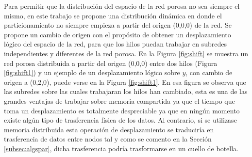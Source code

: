 Para permitir que la distribución del espacio de la red porosa no sea siempre el mismo, en este trabajo se propone
una distribución dinámica en donde el particionamiento no siempre empieza a partir del origen (0,0,0) de la red.
Se propone un cambio de origen con el propósito de obtener un desplazamiento lógico del espacio de la red, para que los hilos 
puedan trabajar en subredes independientes y diferentes de la red porosa.
En la Figura \ref{fig:shift} se muestra un red porosa distribuida a partir del origen (0,0,0) entre dos hilos (Figura \ref{fig:shift1}) 
y un ejemplo de un desplazamiento lógico sobre $y$, con cambio de origen a (0,2,0), puede verse en la Figura \ref{fig:shift1}. En esa figura
se observa que las subredes sobre las cuales 
trabajaran los hilos han cambiado, esta es una de las grandes ventajas de trabajar sobre memoria compartida ya que el tiempo 
que  toma un desplazamiento es totalmente despreciable ya que en ningún momento existe algún tipo de trasferencia física de los datos. 
Al contrario, si se utilizase memoria distribuida esta operación de desplazamiento se traduciría en trasferencia de 
datos entre nodos tal y como se comento en la Secci\'on \ref{subsec:algspar}, dicha trasferencia podría trasformarse en un cuello de botella.\\
